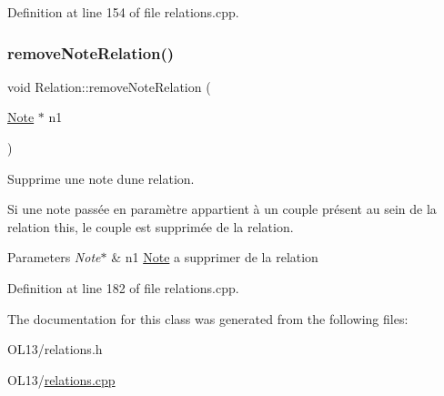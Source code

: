 Definition at line 154 of file relations.\+cpp.

\mbox{\label{class_relation_a8f25fe0ab5bf722eb08d2dd31e99c7f4}} 
\subsubsection{\texorpdfstring{remove\+Note\+Relation()}{removeNoteRelation()}}
{\footnotesize\ttfamily void Relation\+::remove\+Note\+Relation (\begin{DoxyParamCaption}\item[{\hyperlink{class_note}{Note} $\ast$}]{n1 }\end{DoxyParamCaption})}



Supprime une note d\textquotesingle{}une relation. 

Si une note passée en paramètre appartient à un couple présent au sein de la relation this, le couple est supprimée de la relation. 
\begin{DoxyParams}{Parameters}
{\em Note$\ast$} & n1 \hyperlink{class_note}{Note} a supprimer de la relation \\
\hline
\end{DoxyParams}


Definition at line 182 of file relations.\+cpp.



The documentation for this class was generated from the following files\+:\begin{DoxyCompactItemize}
\item 
O\+L13/relations.\+h\item 
O\+L13/\hyperlink{relations_8cpp}{relations.\+cpp}\end{DoxyCompactItemize}
